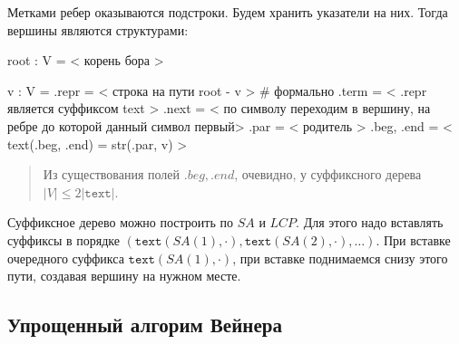 \documentclass[10pt]{book}
\theoremstyle{plain}
\newcommand{\textm}{\texttt{text}}
\begin{document}
Метками ребер оказываются подстроки. Будем хранить указатели на них. Тогда
вершины являются структурами:
\begin{verbm}
  root : V = < корень бора >
  
  v : V = {
    .repr = < строка на пути root - v >  # формально
    .term = < .repr является суффиксом text >
    .next = < по символу переходим в вершину,
              на ребре до которой данный символ первый>
    .par = < родитель >
    .beg, .end = < text(.beg, .end) = str(.par, v) >
  }
\end{verbm}

\begin{quote}
  Из существования полей $.beg, .end$, очевидно, у суффиксного дерева
  $|V| \le 2|\textm|$.
\end{quote}

Суффиксное дерево можно построить по $SA$ и $LCP$. Для этого надо вставлять
суффиксы в порядке $(\textm(SA(1), \cdot), \textm(SA(2), \cdot), \ldots)$.
При вставке очередного суффикса $\textm(SA(1), \cdot)$, при вставке поднимаемся
снизу этого пути, создавая вершину на нужном месте.

\subsection{Упрощенный алгорим Вейнера}
\end{document}
